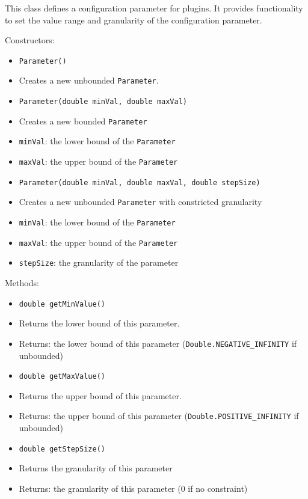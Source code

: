 \documentclass[parskip=full,11pt]{scrartcl}
\begin{document}
This class defines a configuration parameter for plugins. It provides functionality to set the value range and granularity of the configuration parameter.

Constructors:
\begin{itemize}\itemsep -10pt
	\item \texttt{Parameter()}
	\item[] Creates a new unbounded \texttt{Parameter}.

	\item \texttt{Parameter(double minVal, double maxVal)}
	\item[] Creates a new bounded \texttt{Parameter}
	\item[] \texttt{minVal}: the lower bound of the \texttt{Parameter}
	\item[] \texttt{maxVal}: the upper bound of the \texttt{Parameter}
	\item \texttt{Parameter(double minVal, double maxVal, double stepSize)}
	\item[] Creates a new unbounded \texttt{Parameter} with constricted granularity
\item[] \texttt{minVal}: the lower bound of the \texttt{Parameter}
	\item[] \texttt{maxVal}: the upper bound of the \texttt{Parameter}
	\item[] \texttt{stepSize}: the granularity of the parameter

\end{itemize}

Methods:

\begin{itemize}\itemsep -10pt
	\item \texttt{double getMinValue()}
	\item[] Returns the lower bound of this parameter.
	\item[] Returns: the lower bound of this parameter (\texttt{Double.NEGATIVE\_INFINITY} if unbounded)
	\item \texttt{double getMaxValue()}
	\item[] Returns the upper bound of this parameter.
	\item[] Returns: the upper bound of this parameter (\texttt{Double.POSITIVE\_INFINITY} if unbounded)
	\item \texttt{double getStepSize()}
	\item[] Returns the granularity of this parameter
	\item[]Returns: the granularity of this parameter (\(0\) if no constraint)
\end{itemize}
\end{document}
